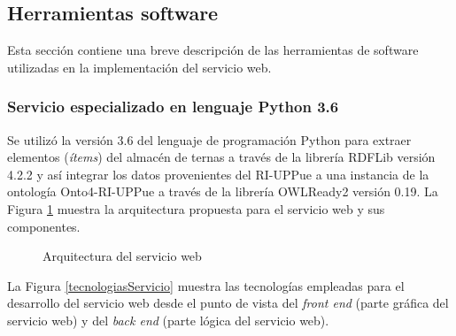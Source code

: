 \subsection{Herramientas software}

Esta secci\'on contiene una breve descripci\'on de las herramientas de software utilizadas en la implementaci\'on del servicio web. 

\subsubsection{Servicio especializado en lenguaje Python 3.6}

Se utiliz\'o la versi\'on 3.6 del lenguaje de programaci\'on Python para extraer elementos (\emph{\'items}) del almac\'en de ternas a trav\'es de la librer\'ia RDFLib  versi\'on 4.2.2  \cite{RDFlib} y as\'i integrar los datos provenientes del RI-UPPue a una instancia de la ontolog\'ia Onto4-RI-UPPue a trav\'es de la librer\'ia OWLReady2 \cite{OWLReady2} versi\'on 0.19. La Figura \ref{arquitecturaServicio} muestra la arquitectura propuesta para el servicio web y sus componentes. 

\begin{figure}[!ht]
	\centering
    \caption{Arquitectura del servicio web}
    \label{arquitecturaServicio}
\end{figure}

La Figura \ref{tecnologiasServicio} muestra las tecnolog\'ias empleadas para el desarrollo del servicio web desde el punto de vista del \emph{front end} (parte gr\'afica del servicio web) y del \emph{back end} (parte l\'ogica del servicio web).

